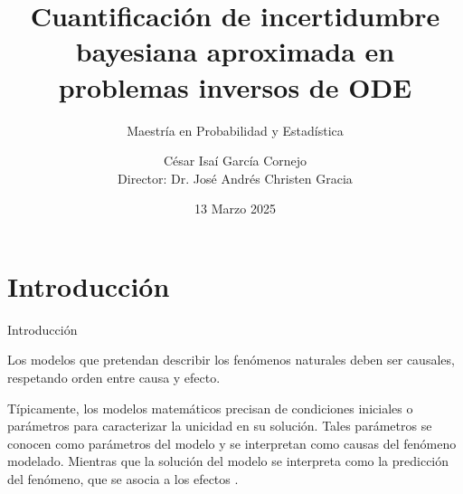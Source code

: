 \documentclass[10pt,aspectratio=169]{beamer}
\title{Cuantificación de incertidumbre bayesiana aproximada en problemas inversos de ODE}
\subtitle{Maestría en Probabilidad y Estadística}
\date{13 Marzo 2025}
\author{César Isaí García Cornejo\\
Director: Dr. José Andrés Christen Gracia}
\institute{CIMAT}
\begin{document}
\maketitle


\section[Introducción]{Introducción}

\begin{frame}[fragile]{Introducción}
  
  Los modelos que pretendan describir los fenómenos naturales deben ser causales, respetando orden entre causa y efecto.

  \vspace{0.5 cm}

  Típicamente, los modelos matemáticos precisan de condiciones iniciales o parámetros  para caracterizar la unicidad en su solución. Tales parámetros se conocen como parámetros del modelo y se interpretan como causas del fenómeno modelado. Mientras que la solución del modelo se interpreta como la predicción del fenómeno, que se asocia a los efectos \cite{tarantola2005inverse}.
  
\end{frame}


  


\end{document}
